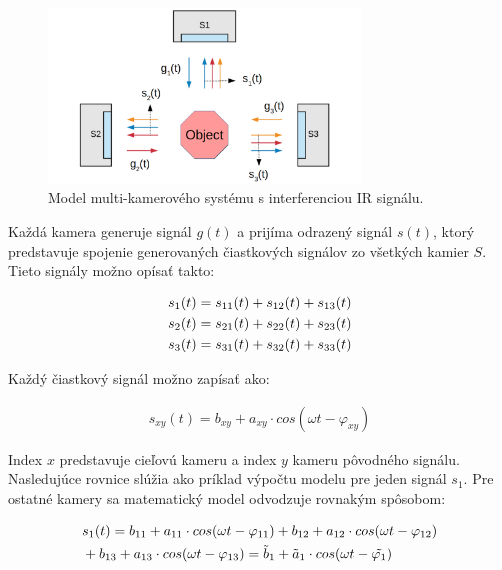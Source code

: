 \begin{figure}[H]
	\centering
	\includegraphics[width=0.74\textwidth]{figures/interference_model.png}
	\caption{Model multi-kamerového systému s interferenciou IR signálu.}
	\label{fig:imodel}
\end{figure}  

Každá kamera generuje signál $g(t)$ a prijíma odrazený signál $s(t)$, ktorý predstavuje spojenie generovaných čiastkových signálov zo všetkých kamier $S$. Tieto signály možno opísať takto:

\begin{equation}
\label{eq::tof::10}
\begin{aligned}
s_1 (t) }= {s_{11}(t)+s_{12}(t)+s_{13}(t) \\
s_2 (t) }= {s_{21}(t)+s_{22}(t)+s_{23}(t) \\
s_3 (t) }= {s_{31}(t)+s_{32}(t)+s_{33}(t) 
\end{aligned}
\end{equation}

\noindent  Každý čiastkový signál možno zapísať ako:

\begin{equation}
\label{eq::tof::11}
\begin{aligned}
 s_{xy}(t) = b_{xy}+a_{xy} \cdot cos(\omega t - \varphi _{xy})
\end{aligned}
\end{equation}

Index $x$ predstavuje cieľovú kameru a index $y$ kameru pôvodného signálu. Nasledujúce rovnice slúžia ako príklad výpočtu modelu pre jeden signál $s_1$. Pre ostatné kamery sa matematický model odvodzuje rovnakým spôsobom:

\begin{equation}
\label{eq::tof::12}
\begin{aligned}
&{s_{1}(t) }= {b_{11}+a_{11} \cdot cos(\omega t - \varphi _{11}) + {b_{12} +a_{12} \cdot cos(\omega t - \varphi _{12})}} \\ 
&+ {{b_{13}+a_{13} \cdot cos(\omega t - \varphi _{13})} = \Tilde{b}_1 + \Tilde{a}_1 \cdot cos(\omega t - \Tilde{\varphi_1})}  
\end{aligned}
\end{equation}

